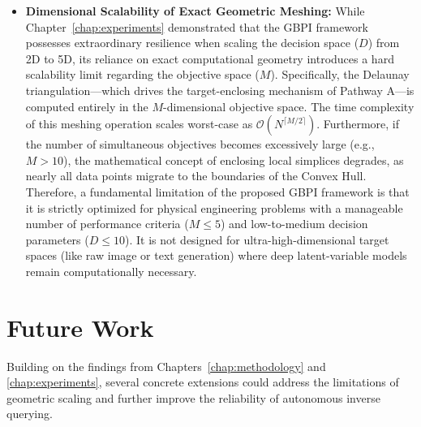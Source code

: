 \begin{itemize}
  \item \textbf{Dimensional Scalability of Exact Geometric Meshing:} 
  While Chapter~\ref{chap:experiments} demonstrated that the GBPI framework possesses extraordinary resilience when scaling the decision space ($D$) from 2D to 5D, its reliance on exact computational geometry introduces a hard scalability limit regarding the objective space ($M$). Specifically, the Delaunay triangulation—which drives the target-enclosing mechanism of Pathway A—is computed entirely in the $M$-dimensional objective space. The time complexity of this meshing operation scales worst-case as $\mathcal{O}(N^{\lceil M/2 \rceil})$. Furthermore, if the number of simultaneous objectives becomes excessively large (e.g., $M > 10$), the mathematical concept of enclosing local simplices degrades, as nearly all data points migrate to the boundaries of the Convex Hull. Therefore, a fundamental limitation of the proposed GBPI framework is that it is strictly optimized for physical engineering problems with a manageable number of performance criteria ($M \le 5$) and low-to-medium decision parameters ($D \le 10$). It is not designed for ultra-high-dimensional target spaces (like raw image or text generation) where deep latent-variable models remain computationally necessary.
  
\end{itemize}


\section{Future Work}\label{sec:future_work}

Building on the findings from Chapters~\ref{chap:methodology} and \ref{chap:experiments}, several concrete extensions could address the limitations of geometric scaling and further improve the reliability of autonomous inverse querying.

